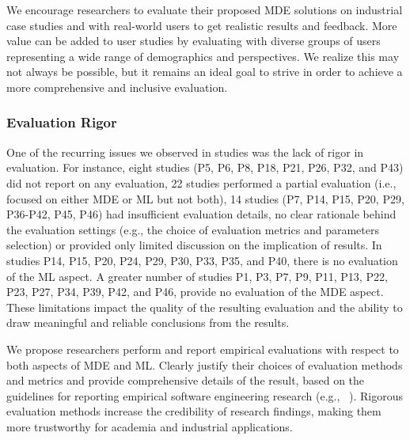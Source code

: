 We encourage researchers to evaluate their proposed MDE solutions on industrial case studies and with real-world users to get realistic results and feedback. More value can be added to user studies by evaluating with diverse groups of users representing a wide range of demographics and perspectives. We realize this may not always be possible, but it remains an ideal goal to strive in order to achieve a more comprehensive and inclusive evaluation.

\subsubsection{Evaluation Rigor}
 
One of the recurring issues we observed in studies was the lack of rigor in evaluation. For instance, eight studies (P5, P6, P8, P18, P21, P26, P32, and P43) did not report on any evaluation, 22 studies performed a partial evaluation (i.e., focused on either MDE or ML but not both), 14 studies (P7, P14, P15, P20, P29, P36-P42, P45, P46) had insufficient evaluation details, no clear rationale behind the evaluation settings (e.g., the choice of evaluation metrics and parameters selection) or provided only limited discussion on the implication of results. In studies P14, P15, P20, P24, P29, P30, P33, P35, and P40, there is no evaluation of the ML aspect. A greater number of studies P1, P3, P7, P9, P11, P13, P22, P23, P27, P34, P39, P42, and P46, provide no evaluation of the MDE aspect. These limitations impact the quality of the resulting evaluation and the ability to draw meaningful and reliable conclusions from the results.


We propose researchers perform and report empirical evaluations with respect to both aspects of MDE and ML. Clearly justify their choices of evaluation methods and metrics and provide comprehensive details of the result, based on the guidelines for reporting empirical software engineering research (e.g., ~\cite{runeson2009guidelines,ralph2020empirical}). Rigorous evaluation methods increase the credibility of research findings, making them more trustworthy for academia and industrial applications.

